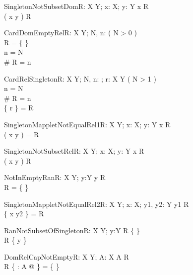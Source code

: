 \begin{theorem}{SingletonNotSubsetDom}{R: X \rel Y; x: X; y: Y}
x \notin \dom R \\
\dom \se( x \mapsto y ) \subset \dom R
\end{theorem}

\begin{theorem}{CardDomEmptyRel}{R: X \rel Y; \const N, n: \nat}
\eval( N > 0 ) \\
R = \{ \} \\
n = N \\
\# \dom R = n
\end{theorem}

\begin{theorem}{CardRelSingleton}{R: X \rel Y; \const N, n: \nat; r: X \cross Y}
\eval( N > 1 ) \\
n = N \\
\# \dom R = n \\
\{ r \} = R
\end{theorem}

\begin{theorem}{SingletonMappletNotEqualRel1}{R: X \rel Y; x: X; y: Y}
x \notin \dom R \\
\se( x \mapsto y ) = R
\end{theorem}

\begin{theorem}{SingletonNotSubsetRel}{R: X \rel Y; x: X; y: Y}
x \notin \dom R \\
\se( x \mapsto y ) \subset R
\end{theorem}

\begin{theorem}{NotInEmptyRan}{R: X \rel Y; y:Y}
y \in \ran R \\
R = \{ \}
\end{theorem}

\begin{theorem}{SingletonMappletNotEqualRel2}{R: X \rel Y; x: X; \const y1, \const y2: Y}
y1 \in \ran R \\
\{ x \mapsto y2 \} = R
\end{theorem}

\begin{theorem}{RanNotSubsetOfSingleton}{R: X \rel Y; y:Y}
R \neq \{ \} \\
\ran R \subset \{ y \} 
\end{theorem}

\begin{theorem}{DomRelCapNotEmpty}{R: X \rel Y; A: \power X}
A \subseteq \dom R \\
\dom R \cap \dom \{ \anything : A @ \anything \} = \{ \}
\end{theorem}


